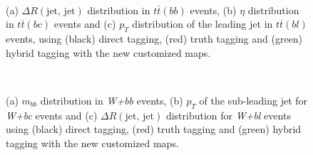 \begin{figure}[!htbp]
\centering
{}
\\
\caption{(a) $ \Delta R(\text{jet, jet})$  distribution in $t\overline{t} (bb)$ events, (b)  $\eta$ distribution in $t\overline{t} (bc)$ events and (c) $p_T$ distribution of the leading jet in $t\overline{t} (bl)$ events, using (black) direct tagging, (red) truth tagging and (green) hybrid tagging with the new customized maps.}
\label{fig:truth_tag_validation_tt}
\end{figure}

\begin{figure}[!htbp]
\centering
{}
\\
\caption{(a) $m_{bb}$ distribution in  \textit{W+bb} events, (b) $p_T$ of the sub-leading jet for \textit{W+bc} events and (c) $\Delta R(\text{jet, jet})$ distribution for \textit{W+bl} events using (black) direct tagging, (red) truth tagging and (green) hybrid tagging with the new customized maps.}
\label{fig:truth_tag_validation_wjets}
\end{figure}